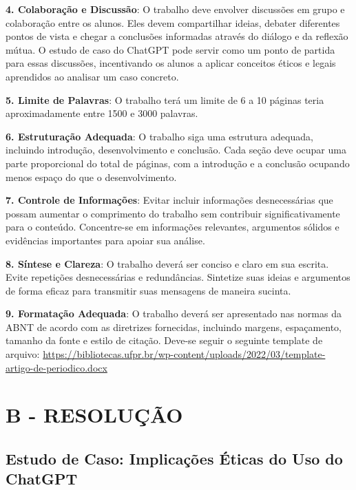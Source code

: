 \textbf{4. Colaboração e Discussão}: O trabalho deve envolver discussões em grupo e colaboração entre os alunos. Eles
devem compartilhar ideias, debater diferentes pontos de vista e chegar a conclusões informadas através do diálogo e da
reflexão mútua. O estudo de caso do ChatGPT pode servir como um ponto de partida para essas discussões, incentivando os
alunos a aplicar conceitos éticos e legais aprendidos ao analisar um caso concreto.

\textbf{5. Limite de Palavras}: O trabalho terá um limite de 6 a 10 páginas teria aproximadamente entre 1500 e 3000
palavras.

\textbf{6. Estruturação Adequada}: O trabalho siga uma estrutura adequada, incluindo introdução, desenvolvimento e
conclusão. Cada seção deve ocupar uma parte proporcional do total de páginas, com a introdução e a conclusão ocupando
menos espaço do que o desenvolvimento.

\textbf{7. Controle de Informações}: Evitar incluir informações desnecessárias que possam aumentar o comprimento do
trabalho sem contribuir significativamente para o conteúdo. Concentre-se em informações relevantes, argumentos sólidos
e evidências importantes para apoiar sua análise.

\textbf{8. Síntese e Clareza}: O trabalho deverá ser conciso e claro em sua escrita. Evite repetições desnecessárias e
redundâncias. Sintetize suas ideias e argumentos de forma eficaz para transmitir suas mensagens de maneira sucinta. 

\textbf{9. Formatação Adequada}: O trabalho deverá ser apresentado nas normas da ABNT de acordo com as diretrizes
fornecidas, incluindo margens, espaçamento, tamanho da fonte e estilo de citação. Deve-se seguir o seguinte template de
arquivo: \url{https://bibliotecas.ufpr.br/wp-content/uploads/2022/03/template-artigo-de-periodico.docx}


\section*{\textbf{B - RESOLUÇÃO}}
\subsection*{\textbf{Estudo de Caso: Implicações Éticas do Uso do ChatGPT}}

